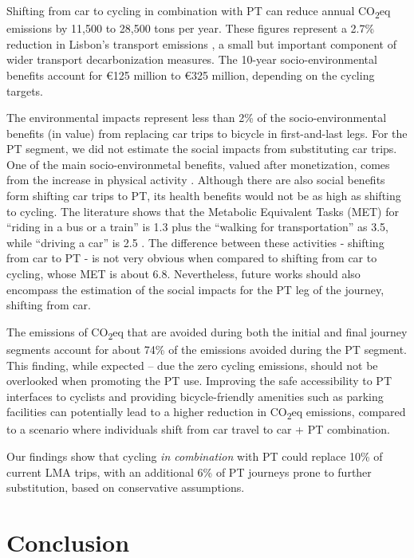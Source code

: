 \documentclass[review, doubleblind, 3p,
authoryear]{elsarticle} %
\begin{document}
Shifting from car to cycling in combination with PT can reduce annual
CO\textsubscript{2}eq emissions by 11,500 to 28,500 tons per year. These
figures represent a 2.7\% reduction in Lisbon's transport emissions
\citep{LisboaENova}, a small but important component of wider transport
decarbonization measures. The 10-year socio-environmental benefits
account for €125 million to €325 million, depending on the cycling
targets.

The environmental impacts represent less than 2\% of the
socio-environmental benefits (in value) from replacing car trips to
bicycle in first-and-last legs. For the PT segment, we did not estimate
the social impacts from substituting car trips. One of the main
socio-environmetal benefits, valued after monetization, comes from the
increase in physical activity \citep{Felix2023ES}. Although there are
also social benefits form shifting car trips to PT, its health benefits
would not be as high as shifting to cycling. The literature shows that
the Metabolic Equivalent Tasks (MET) for ``riding in a bus or a train''
is 1.3 plus the ``walking for transportation'' as 3.5, while ``driving a
car'' is 2.5 \citep{MET2011}. The difference between these activities -
shifting from car to PT - is not very obvious when compared to shifting
from car to cycling, whose MET is about 6.8. Nevertheless, future works
should also encompass the estimation of the social impacts for the PT
leg of the journey, shifting from car.

The emissions of CO\textsubscript{2}eq that are avoided during both the
initial and final journey segments account for about 74\% of the
emissions avoided during the PT segment. This finding, while expected --
due the zero cycling emissions, should not be overlooked when promoting
the PT use. Improving the safe accessibility to PT interfaces to
cyclists and providing bicycle-friendly amenities such as parking
facilities can potentially lead to a higher reduction in
CO\textsubscript{2}eq emissions, compared to a scenario where
individuals shift from car travel to car + PT combination.

Our findings show that cycling \emph{in combination} with PT could
replace 10\% of current LMA trips, with an additional 6\% of PT journeys
prone to further substitution, based on conservative assumptions.

\section{Conclusion}\label{conclusion}
\end{document}
